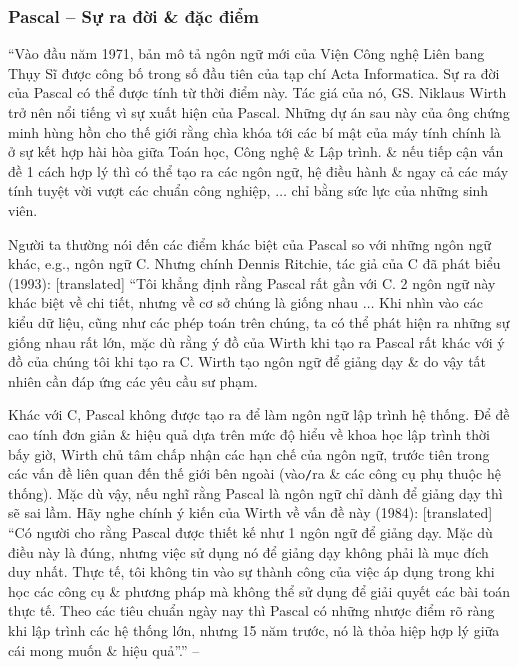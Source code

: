 \documentclass[oneside]{book}
\numberwithin{equation}{section}
\begin{document}
\subsubsection{Pascal -- Sự ra đời \& đặc điểm}
``Vào đầu năm 1971, bản mô tả ngôn ngữ mới của Viện Công nghệ Liên bang Thụy Sĩ được công bố trong số đầu tiên của tạp chí Acta Informatica. Sự ra đời của Pascal có thể được tính từ thời điểm này. Tác giá của nó, GS. Niklaus Wirth trở nên nổi tiếng vì sự xuất hiện của Pascal. Những dự án sau này của ông chứng minh hùng hồn cho thế giới rằng chìa khóa tới các bí mật của máy tính chính là ở sự kết hợp hài hòa giữa Toán học, Công nghệ \& Lập trình. \& nếu tiếp cận vấn đề 1 cách hợp lý thì có thể tạo ra các ngôn ngữ, hệ điều hành \& ngay cả các máy tính tuyệt vời vượt các chuẩn công nghiệp, $\ldots$ chỉ bằng sức lực của những sinh viên.

Người ta thường nói đến các điểm khác biệt của Pascal so với những ngôn ngữ khác, e.g., ngôn ngữ C. Nhưng chính Dennis Ritchie, tác giả của C đã phát biểu (1993): [translated] ``Tôi khẳng định rằng Pascal rất gần với C. 2 ngôn ngữ này khác biệt về chi tiết, nhưng về cơ sở chúng là giống nhau $\ldots$ Khi nhìn vào các kiểu dữ liệu, cũng như các phép toán trên chúng, ta có thể phát hiện ra những sự giống nhau rất lớn, mặc dù rằng ý đồ của Wirth khi tạo ra Pascal rất khác với ý đồ của chúng tôi khi tạo ra C. Wirth tạo ngôn ngữ để giảng dạy \& do vậy tất nhiên cần đáp ứng các yêu cầu sư phạm.

Khác với C, Pascal không được tạo ra để làm ngôn ngữ lập trình hệ thống. Để đề cao tính đơn giản \& hiệu quả dựa trên mức độ hiểu về khoa học lập trình thời bấy giờ, Wirth chủ tâm chấp nhận các hạn chế của ngôn ngữ, trước tiên trong các vấn đề liên quan đến thế giới bên ngoài (vào\texttt{/}ra \& các công cụ phụ thuộc hệ thống). Mặc dù vậy, nếu nghĩ rằng Pascal là ngôn ngữ chỉ dành để giảng dạy thì sẽ sai lầm. Hãy nghe chính ý kiến của Wirth về vấn đề này (1984): [translated] ``Có người cho rằng Pascal được thiết kế như 1 ngôn ngữ để giảng dạy. Mặc dù điều này là đúng, nhưng việc sử dụng nó để giảng dạy không phải là mục đích duy nhất. Thực tế, tôi không tin vào sự thành công của việc áp dụng trong khi học các công cụ \& phương pháp mà không thể sử dụng để giải quyết các bài toán thực tế. Theo các tiêu chuẩn ngày nay thì Pascal có những nhược điểm rõ ràng khi lập trình các hệ thống lớn, nhưng 15 năm trước, nó là thỏa hiệp hợp lý giữa cái mong muốn \& hiệu quả''.'' -- \cite[p. 15]{SGK_Tin_Hoc_11}
\end{document}
